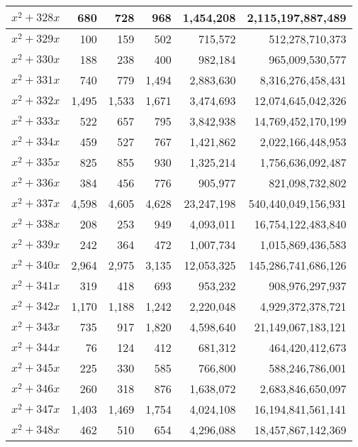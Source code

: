 \documentclass[a4paper]{amsproc}
\theoremstyle{plain}
\begin{document}
\begin{longtable}{ | l | r | r | r | r | r | }
$x^2 + 328x$ & 680 & 728 & 968 & 1{,}454{,}208 & 2{,}115{,}197{,}887{,}489 \\ \hline
$x^2 + 329x$ & 100 & 159 & 502 & 715{,}572 & 512{,}278{,}710{,}373 \\ \hline
$x^2 + 330x$ & 188 & 238 & 400 & 982{,}184 & 965{,}009{,}530{,}577 \\ \hline
$x^2 + 331x$ & 740 & 779 & 1{,}494 & 2{,}883{,}630 & 8{,}316{,}276{,}458{,}431 \\ \hline
$x^2 + 332x$ & 1{,}495 & 1{,}533 & 1{,}671 & 3{,}474{,}693 & 12{,}074{,}645{,}042{,}326 \\ \hline
$x^2 + 333x$ & 522 & 657 & 795 & 3{,}842{,}938 & 14{,}769{,}452{,}170{,}199 \\ \hline
$x^2 + 334x$ & 459 & 527 & 767 & 1{,}421{,}862 & 2{,}022{,}166{,}448{,}953 \\ \hline
$x^2 + 335x$ & 825 & 855 & 930 & 1{,}325{,}214 & 1{,}756{,}636{,}092{,}487 \\ \hline
$x^2 + 336x$ & 384 & 456 & 776 & 905{,}977 & 821{,}098{,}732{,}802 \\ \hline
$x^2 + 337x$ & 4{,}598 & 4{,}605 & 4{,}628 & 23{,}247{,}198 & 540{,}440{,}049{,}156{,}931 \\ \hline
$x^2 + 338x$ & 208 & 253 & 949 & 4{,}093{,}011 & 16{,}754{,}122{,}483{,}840 \\ \hline
$x^2 + 339x$ & 242 & 364 & 472 & 1{,}007{,}734 & 1{,}015{,}869{,}436{,}583 \\ \hline
$x^2 + 340x$ & 2{,}964 & 2{,}975 & 3{,}135 & 12{,}053{,}325 & 145{,}286{,}741{,}686{,}126 \\ \hline
$x^2 + 341x$ & 319 & 418 & 693 & 953{,}232 & 908{,}976{,}297{,}937 \\ \hline
$x^2 + 342x$ & 1{,}170 & 1{,}188 & 1{,}242 & 2{,}220{,}048 & 4{,}929{,}372{,}378{,}721 \\ \hline
$x^2 + 343x$ & 735 & 917 & 1{,}820 & 4{,}598{,}640 & 21{,}149{,}067{,}183{,}121 \\ \hline
$x^2 + 344x$ & 76 & 124 & 412 & 681{,}312 & 464{,}420{,}412{,}673 \\ \hline
$x^2 + 345x$ & 225 & 330 & 585 & 766{,}800 & 588{,}246{,}786{,}001 \\ \hline
$x^2 + 346x$ & 260 & 318 & 876 & 1{,}638{,}072 & 2{,}683{,}846{,}650{,}097 \\ \hline
$x^2 + 347x$ & 1{,}403 & 1{,}469 & 1{,}754 & 4{,}024{,}108 & 16{,}194{,}841{,}561{,}141 \\ \hline
$x^2 + 348x$ & 462 & 510 & 654 & 4{,}296{,}088 & 18{,}457{,}867{,}142{,}369 \\ \hline

\end{longtable}
\end{document}
